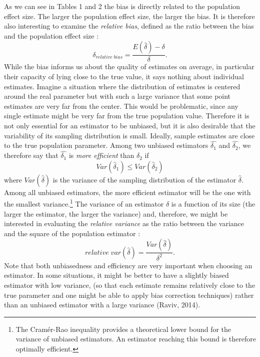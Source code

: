 \documentclass[
  english,
  man,floatsintext]{apa6}
\begin{document}
As we can see in Tables 1 and 2 the bias is directly related to the population effect size. The larger the population effect size, the larger the bias. It is therefore also interesting to examine the \emph{relative bias}, defined as the ratio between the bias and the population effect size :
\begin{equation} 
\delta_{relative \; bias}=\frac{E(\hat{\delta})-\delta}{\delta}.
\label{eqn:RELBIAS}
\end{equation}
While the bias informs us about the quality of estimates on average, in particular their capacity of lying close to the true value, it says nothing about individual estimates. Imagine a situation where the distribution of estimates is centered around the real parameter but with such a large variance that some point estimates are very far from the center. This would be problematic, since any single estimate might be very far from the true population value. Therefore it is not only essential for an estimator to be unbiased, but it is also desirable that the variability of its sampling distribution is small. Ideally, sample estimates are close to the true population parameter. Among two unbiased estimators \(\hat{\delta_1}\) and \(\hat{\delta_2}\), we therefore say that \(\hat{\delta_1}\) is \emph{more efficient} than \(\hat{\delta_2}\) if
\begin{equation} 
Var(\hat{\delta}_1) \leq Var(\hat{\delta}_2)
\label{eqn:EFFICIENCY}
\end{equation}
where \(Var(\hat{\delta})\) is the variance of the sampling distribution of the estimator \(\hat{\delta}\). Among all unbiased estimators, the more efficient estimator will be the one with the smallest variance.\footnote{The Cramér-Rao inequality provides a theoretical lower bound for the variance of unbiased estimators. An estimator reaching this bound is therefore optimally efficient.} The variance of an estimator \(\hat{\delta}\) is a function of its size (the larger the estimator, the larger the variance) and, therefore, we might be interested in evaluating the \emph{relative variance} as the ratio between the variance and the square of the population estimator :
\begin{equation} 
relative \; var(\hat{\delta})=\frac{Var(\hat{\delta})}{\delta^2}.
\label{eqn:RELVAR}
\end{equation}
Note that both unbiasedness and efficiency are very important when choosing an estimator. In some situations, it might be better to have a slightly biased estimator with low variance, (so that each estimate remains relatively close to the true parameter and one might be able to apply bias correction techniques) rather than an unbiased estimator with a large variance (Raviv, 2014).
\end{document}

